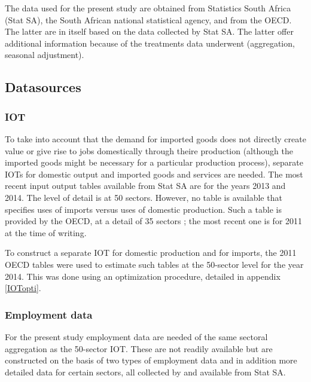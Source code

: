 \documentclass[12pt,english]{article}
\begin{document}
The data used for the present study are obtained from Statistics South Africa (Stat SA), the South African national statistical agency, and from the OECD. The latter are in itself based on the data collected by Stat SA. The latter offer additional information because of the treatments data underwent (aggregation, seasonal adjustment). %

\subsection{Datasources}

\subsubsection{IOT}	

To take into account that the demand for imported goods does not directly create value or give rise to jobs domestically through theire production (although the imported goods might be necessary for a particular production process), separate IOTs for domestic output and imported goods and services are needed. The most recent input output tables available from Stat SA are for the years 2013 and 2014. The level of detail is at 50 sectors. However, no table is available that specifies uses of imports versus uses of domestic production. Such a table is provided by the OECD, at a detail of 35 sectors ; the most recent one is for 2011 at the time of writing.

To construct a separate IOT for domestic production and for imports, the 2011 OECD tables were used to estimate such tables at the 50-sector level for the year 2014. This was done using an optimization procedure, detailed in appendix \ref{IOTopti}.


\subsubsection{Employment data}
For the present study employment data are needed of the same sectoral aggregation as the 50-sector IOT. These are not readily available but are constructed on the basis of two types of employment data and in addition more detailed data for certain sectors, all collected by and available from Stat SA.
 
\end{document}
